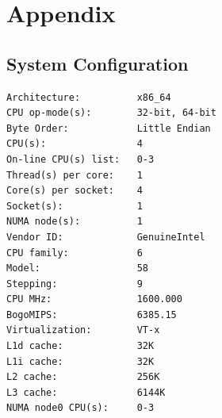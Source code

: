 \documentclass[11pt]{article} %
\begin{document}
\section{Appendix}

\subsection{System Configuration}

\begin{verbatim}
Architecture:          x86_64
CPU op-mode(s):        32-bit, 64-bit
Byte Order:            Little Endian
CPU(s):                4
On-line CPU(s) list:   0-3
Thread(s) per core:    1
Core(s) per socket:    4
Socket(s):             1
NUMA node(s):          1
Vendor ID:             GenuineIntel
CPU family:            6
Model:                 58
Stepping:              9
CPU MHz:               1600.000
BogoMIPS:              6385.15
Virtualization:        VT-x
L1d cache:             32K
L1i cache:             32K
L2 cache:              256K
L3 cache:              6144K
NUMA node0 CPU(s):     0-3
\end{verbatim}

\end{document}
